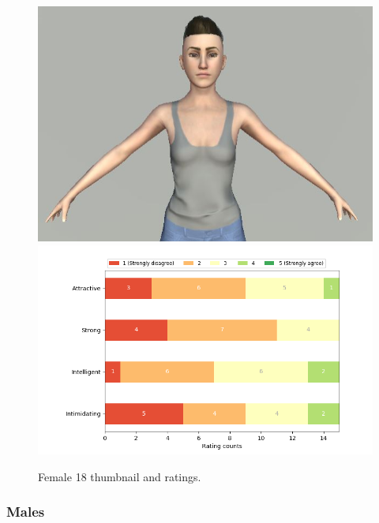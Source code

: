 \begin{figure}[H]
  \includegraphics[width=\linewidth]{Images/Females/18.JPG}
\endminipage\hfill
{}
  \includegraphics[width=\linewidth]{Survey/FRatings/avatar_f18.png}
\endminipage\hfill
\caption{Female 18 thumbnail and ratings.}
\end{figure}

\subsubsection{Males}

